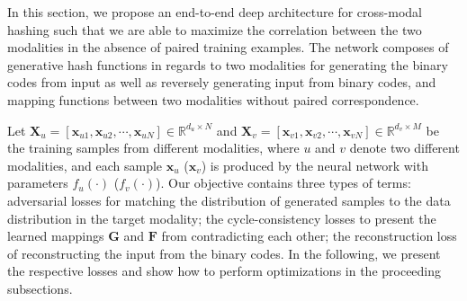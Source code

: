 \documentclass[10pt,journal,twocolumn]{IEEEtran}
\begin{document}

In this section, we propose an end-to-end deep architecture for cross-modal hashing such that we are able to maximize the correlation between the two modalities in the absence of paired training examples. The network composes of generative hash functions in regards to two modalities for generating the binary codes from input as well as reversely generating input from binary codes, and mapping functions between two modalities without paired correspondence.

Let $\boldsymbol X_u= [\boldsymbol x_{u1}, \boldsymbol x_{u2},\cdots, \boldsymbol x_{uN}]\in \mathbb{R}^{d_u \times N}$ and $\boldsymbol X_v= [\boldsymbol x_{v1}, \boldsymbol x_{v2},\cdots, \boldsymbol x_{vN}]\in \mathbb{R}^{d_v \times M}$ be the training samples from different modalities, where $u$ and $v$ denote two different modalities, and each sample $\boldsymbol x_u$ ($\boldsymbol x_v$) is produced by the neural network with parameters $f_u (\cdot)$ ($f_v(\cdot)$). Our objective contains three types of terms: adversarial losses \cite{GAN} for matching the distribution of generated samples to the data distribution in the target modality; the cycle-consistency losses \cite{CycleGAN} to present the learned mappings $\boldsymbol G$ and $\boldsymbol F$ from contradicting each other; the reconstruction loss of reconstructing the input from the binary codes. In the following, we present the respective losses and show how to perform optimizations in the proceeding subsections.
\end{document}

